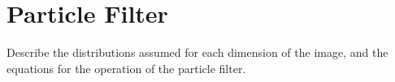 \section*{Particle Filter}

Describe the distributions assumed for each dimension of the image, and the
equations for the operation of the particle filter.